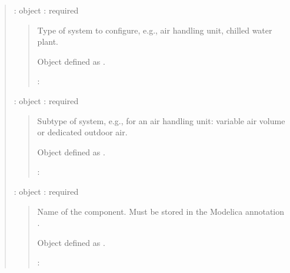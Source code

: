 \documentclass[letterpaper,10pt, openany,english]{sphinxmanual}
\begin{document}
\label{\detokenize{requirements:configuration-data}}
\begin{quote}

 : object : required
\begin{quote}

\begin{DUlineblock}{0em}
\item[] Type of system to configure, e.g., air handling unit, chilled water plant.
\item[] Object defined as {\hyperref[\detokenize{requirements:elementary-object}]{}}.
\end{DUlineblock}

 : 
\end{quote}

 : object : required
\begin{quote}

\begin{DUlineblock}{0em}
\item[] Subtype of system, e.g., for an air handling unit: variable air volume or dedicated outdoor air.
\item[] Object defined as {\hyperref[\detokenize{requirements:elementary-object}]{}}.
\end{DUlineblock}

 : 
\end{quote}

 : object : required
\begin{quote}

\begin{DUlineblock}{0em}
\item[] Name of the component. Must be stored in the Modelica annotation .
\item[] Object defined as {\hyperref[\detokenize{requirements:elementary-object}]{}}.
\end{DUlineblock}

 : 
\end{quote}


\end{quote}
\end{document}
